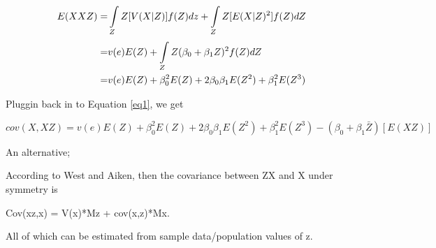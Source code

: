 \documentclass[man, babel,english]{apa}%
\begin{document}
\begin{align}
 \nonumber E(XXZ) =& \int\limits_{Z}^{} Z[V(X|Z)]f(Z)dz + \int\limits_{Z}^{}Z[E(X|Z)^2]f(Z) dZ \\
 \nonumber 	=& v(e)E(Z) + \int\limits_{Z}^{} Z(\beta_0 + \beta_1Z)^2f(Z)dZ \\
 \nonumber 	=& v(e)E(Z) + \beta_0^2E(Z) + 2\beta_0\beta_1E(Z^2) + \beta_1^2E(Z^3)
\end{align}

Pluggin back in to Equation \ref{eq1}, we get

\begin{equation}
cov(X,XZ) = v(e)E(Z) + \beta_0^2E(Z) + 2\beta_0\beta_1E(Z^2) + \beta_1^2E(Z^3) - (\beta_0 + \beta_1\bar{Z})[E(XZ)]
\label{eq1}
\end{equation}



An alternative;

According to West and Aiken, then the covariance between ZX and X under symmetry is
 
                                                                                                        Cov(xz,x) = V(x)*Mz + cov(x,z)*Mx.
                                                                                                        
                                                                                                        All of which can be estimated from sample data/population values of z. 



%
%	
\end{document}
